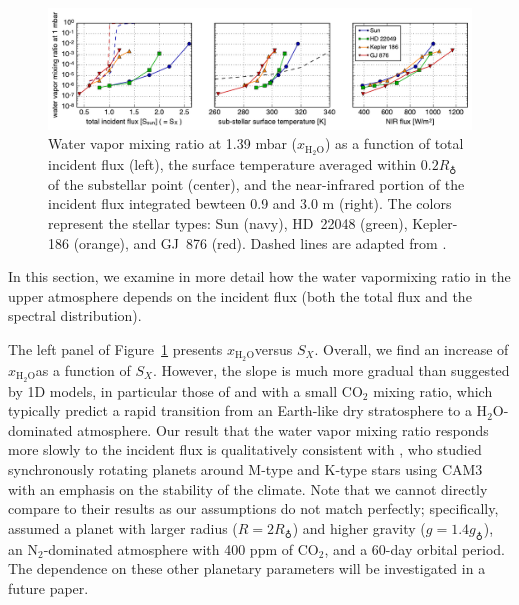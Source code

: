 \documentclass[11pt,numberedappendix,twocolappendix,]{emulateapj}
\def\water{H$_2$O}
\def\xwater{$x_\text{\water}$}
\def\preslevel{1.39 mbar}
\def\wv{water vapor}
\begin{document}
\begin{figure}[!tb]
    \begin{center}
    \includegraphics[width=\hsize]{xH2O_3panels.pdf}
    \end{center}
\caption{Water vapor mixing ratio at \preslevel{} (\xwater{}) as a function of total incident flux (left), the surface temperature averaged within $0.2R_\earth$ of the substellar point (center), and the near-infrared portion of the incident flux integrated bewteen 0.9 and 3.0 \textmu m (right). The colors represent the stellar types: Sun (navy), HD~22048 (green), Kepler-186 (orange), and GJ~876 (red). Dashed lines are adapted from \citet{Kasting1993}. }                                                                                                             
\label{fig:xH2O_S0X}
\end{figure}

In this section, we examine in more detail how the \wv mixing ratio in the upper atmosphere depends on the incident flux (both the total flux and the spectral distribution). 

The left panel of Figure~\ref{fig:xH2O_S0X} presents \xwater versus $S_X$. 
Overall, we find an increase of \xwater as a function of $S_X$. 
However, the slope is much more gradual than suggested by 1D models, in particular those  of \citet{Kasting1993} and \citet{Wordsworth2013} with a small CO$_2$ mixing ratio, which typically predict a rapid transition from an Earth-like dry stratosphere to a \water{}-dominated atmosphere. 
Our result that the \wv{} mixing ratio responds more slowly to the incident flux is qualitatively consistent with \citet{Yang2013}, who studied synchronously rotating planets around M-type and K-type stars using CAM3 with an emphasis on the stability of the climate. 
Note that we cannot directly compare to their results as our assumptions do not match perfectly; specifically, \cite{Yang2013} assumed a planet with larger radius ($R=2R_\earth$) and higher gravity ($g=1.4g_\earth$), an N$_2$-dominated atmosphere with 400 ppm of CO$_2$, and a 60-day orbital period. 
The dependence on these other planetary parameters will be investigated in a future paper. 
\end{document}
